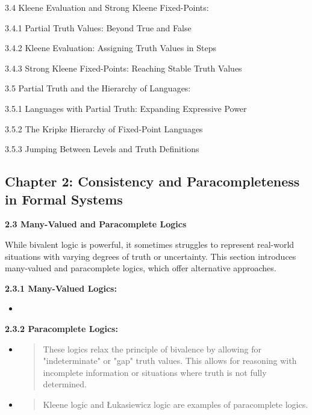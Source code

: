 3.4 Kleene Evaluation and Strong Kleene Fixed-Points:

3.4.1 Partial Truth Values: Beyond True and False

3.4.2 Kleene Evaluation: Assigning Truth Values in Steps

3.4.3 Strong Kleene Fixed-Points: Reaching Stable Truth Values

3.5 Partial Truth and the Hierarchy of Languages:

3.5.1 Languages with Partial Truth: Expanding Expressive Power

3.5.2 The Kripke Hierarchy of Fixed-Point Languages

3.5.3 Jumping Between Levels and Truth Definitions

\hypertarget{chapter-2-consistency-and-paracompleteness-in-formal-systems}{%
\subsection*{Chapter 2: Consistency and Paracompleteness in Formal
Systems}\label{chapter-2-consistency-and-paracompleteness-in-formal-systems}}

\textbf{2.3 Many-Valued and Paracomplete Logics}

While bivalent logic is powerful, it sometimes struggles to represent
real-world situations with varying degrees of truth or uncertainty. This
section introduces many-valued and paracomplete logics, which offer
alternative approaches.

\textbf{2.3.1 Many-Valued Logics:}

\begin{itemize}
\tightlist
\item
\end{itemize}

\textbf{2.3.2 Paracomplete Logics:}

\begin{itemize}
\item
  \begin{quote}
  These logics relax the principle of bivalence by allowing for
  "indeterminate" or "gap" truth values. This allows for reasoning with
  incomplete information or situations where truth is not fully
  determined.
  \end{quote}
\item
  \begin{quote}
  Kleene logic and Łukasiewicz logic are examples of paracomplete
  logics.
  \end{quote}
\end{itemize}

